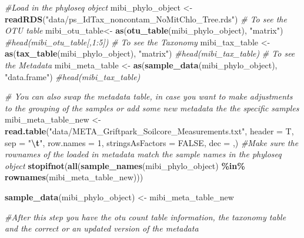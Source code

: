 \documentclass[
]{article}
\newenvironment{Shaded}{\begin{snugshade}}{\end{snugshade}}
\newcommand{\AttributeTok}[1]{\textcolor[rgb]{0.13,0.29,0.53}{#1}}
\newcommand{\CommentTok}[1]{\textcolor[rgb]{0.56,0.35,0.01}{\textit{#1}}}
\newcommand{\ConstantTok}[1]{\textcolor[rgb]{0.56,0.35,0.01}{#1}}
\newcommand{\DecValTok}[1]{\textcolor[rgb]{0.00,0.00,0.81}{#1}}
\newcommand{\FunctionTok}[1]{\textcolor[rgb]{0.13,0.29,0.53}{\textbf{#1}}}
\newcommand{\NormalTok}[1]{#1}
\newcommand{\OtherTok}[1]{\textcolor[rgb]{0.56,0.35,0.01}{#1}}
\newcommand{\SpecialCharTok}[1]{\textcolor[rgb]{0.81,0.36,0.00}{\textbf{#1}}}
\newcommand{\StringTok}[1]{\textcolor[rgb]{0.31,0.60,0.02}{#1}}
\begin{document}
\begin{Shaded}
\begin{Highlighting}[]
\CommentTok{\#Load in the phyloseq object}
\NormalTok{mibi\_phylo\_object }\OtherTok{\textless{}{-}} \FunctionTok{readRDS}\NormalTok{(}\StringTok{"data/ps\_IdTax\_noncontam\_NoMitChlo\_Tree.rds"}\NormalTok{) }
\CommentTok{\# To see the OTU table}
\NormalTok{mibi\_otu\_table}\OtherTok{\textless{}{-}} \FunctionTok{as}\NormalTok{(}\FunctionTok{otu\_table}\NormalTok{(mibi\_phylo\_object), }\StringTok{"matrix"}\NormalTok{)}
\CommentTok{\#head(mibi\_otu\_table[,1:5])}
\CommentTok{\# To see the Taxonomy}
\NormalTok{mibi\_tax\_table }\OtherTok{\textless{}{-}} \FunctionTok{as}\NormalTok{(}\FunctionTok{tax\_table}\NormalTok{(mibi\_phylo\_object), }\StringTok{"matrix"}\NormalTok{)}
\CommentTok{\#head(mibi\_tax\_table)}
\CommentTok{\# To see the Metadata}
\NormalTok{mibi\_meta\_table }\OtherTok{\textless{}{-}} \FunctionTok{as}\NormalTok{(}\FunctionTok{sample\_data}\NormalTok{(mibi\_phylo\_object), }\StringTok{"data.frame"}\NormalTok{)}
\CommentTok{\#head(mibi\_tax\_table)}

\CommentTok{\# You can also swap the metadata table, in case you want to make adjustments to the grouping of the samples or add some new metadata the the specific samples}
\NormalTok{mibi\_meta\_table\_new }\OtherTok{\textless{}{-}} \FunctionTok{read.table}\NormalTok{(}\StringTok{"data/META\_Griftpark\_Soilcore\_Measurements.txt"}\NormalTok{, }\AttributeTok{header =}\NormalTok{ T, }\AttributeTok{sep =} \StringTok{"}\SpecialCharTok{\textbackslash{}t}\StringTok{"}\NormalTok{, }\AttributeTok{row.names =} \DecValTok{1}\NormalTok{, }\AttributeTok{stringsAsFactors =} \ConstantTok{FALSE}\NormalTok{, }\AttributeTok{dec =} \StringTok{\textquotesingle{},\textquotesingle{}}\NormalTok{)}
\CommentTok{\#Make sure the rownames of the loaded in metadata match the sample names in the phyloseq object}
\FunctionTok{stopifnot}\NormalTok{(}\FunctionTok{all}\NormalTok{(}\FunctionTok{sample\_names}\NormalTok{(mibi\_phylo\_object) }\SpecialCharTok{\%in\%} \FunctionTok{rownames}\NormalTok{(mibi\_meta\_table\_new)))}

\FunctionTok{sample\_data}\NormalTok{(mibi\_phylo\_object) }\OtherTok{\textless{}{-}}\NormalTok{ mibi\_meta\_table\_new}

\CommentTok{\#After this step you have the otu count table information, the taxonomy table and the correct or an updated version of the metadata}
\end{Highlighting}
\end{Shaded}
\end{document}
